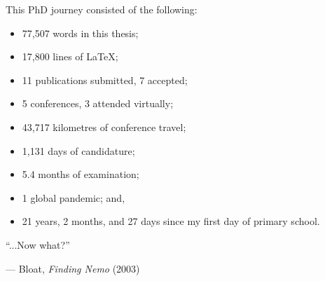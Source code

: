 
\cleardoubleevenemptypage
\thispagestyle{empty}

\vspace*{\fill}

\rmfamily

This PhD journey consisted of the following:

\bigskip

\begin{itemize}
    \item 77,507 words in this thesis;
    \item 17,800 lines of \LaTeX;
    \item 11 publications submitted, 7 accepted;
    \item 5 conferences, 3 attended virtually;
    \item 43,717 kilometres of conference travel;
    \item 1,131 days of candidature; %
    \item 5.4 months of examination; %
    \item 1 global pandemic; and,
    \item 21 years, 2 months, and 27 days since my first day of primary school.
\end{itemize}

\bigskip


\epigraph{``...Now what?''}{--- Bloat, \textit{Finding Nemo} (2003)}
\vspace*{\fill}